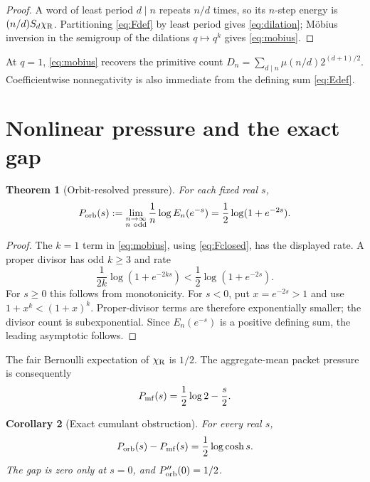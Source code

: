 \documentclass[11pt]{article}
\newtheorem{theorem}{Theorem}[section]
\newtheorem{corollary}[theorem]{Corollary}
\newcommand{\chiR}{\chi_{\rm R}}
\begin{document}
\begin{proof}
A word of least period $d\mid n$ repeats $n/d$ times, so its $n$-step
energy is $(n/d)S_d\chiR$.  Partitioning \eqref{eq:Fdef} by least period
gives \eqref{eq:dilation}; M\"obius inversion in the semigroup of the
dilations $q\mapsto q^k$ gives \eqref{eq:mobius}.
\end{proof}

At $q=1$, \eqref{eq:mobius} recovers the primitive count
$D_n=\sum_{d\mid n}\mu(n/d)2^{(d+1)/2}$.  Coefficientwise nonnegativity is
also immediate from the defining sum \eqref{eq:Edef}.

\section{Nonlinear pressure and the exact gap}

\begin{theorem}[Orbit-resolved pressure]\label{thm:pressure}
For each fixed real $s$,
\begin{equation}\label{eq:pressure}
 P_{\rm orb}(s):=
 \lim_{\substack{n\to\infty\\n\ {\rm odd}}}
 \frac1n\log E_n(e^{-s})
 =\frac12\log(1+e^{-2s}).
\end{equation}
\end{theorem}

\begin{proof}
The $k=1$ term in \eqref{eq:mobius}, using \eqref{eq:Fclosed}, has the
displayed rate.  A proper divisor has odd $k\ge3$ and rate
\[
 \frac1{2k}\log(1+e^{-2ks})
 <\frac12\log(1+e^{-2s}).
\]
For $s\ge0$ this follows from monotonicity.  For $s<0$, put
$x=e^{-2s}>1$ and use $1+x^k<(1+x)^k$.  Proper-divisor terms are therefore
exponentially smaller; the divisor count is subexponential.  Since
$E_n(e^{-s})$ is a positive defining sum, the leading asymptotic follows.
\end{proof}

The fair Bernoulli expectation of $\chiR$ is $1/2$.  The aggregate-mean
packet pressure is consequently
\begin{equation}\label{eq:mean}
 P_{\rm mf}(s)=\frac12\log2-\frac s2.
\end{equation}

\begin{corollary}[Exact cumulant obstruction]\label{cor:gap}
For every real $s$,
\begin{equation}\label{eq:gap}
 P_{\rm orb}(s)-P_{\rm mf}(s)=\frac12\log\cosh s.
\end{equation}
The gap is zero only at $s=0$, and $P_{\rm orb}''(0)=1/2$.
\end{corollary}
\end{document}
